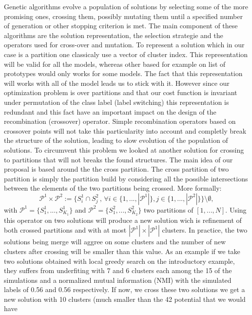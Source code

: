 \documentclass[]{article}
\begin{document}
Genetic algorithms evolve a population of solutions by selecting some of
the more promising ones, crossing them, possibly mutating them until a
specified number of generation or other stopping criterion is met. The
main component of these algorithms are the solution representation, the
selection strategie and the operators used for cross-over and mutation.
To represent a solution which in our case is a partition one classicaly
use a vector of cluster index. This representation will be valid for all
the models, whereas other based for example on list of prototypes would
only works for some models. The fact that this representation will works
with all of the model leads us to stick with it. However since our
optimization problem is over partitions and that our cost function is
invariant under permutation of the class label (label switching) this
representation is redundant and this fact have an important impact on
the design of the recombination (crossover) operator. Simple
recombination operators based on crossover points will not take this
particularity into account and completly break the structure of the
solution, leading to slow evolution of the population of solutions. To
circumvent this problem we looked at another solution for crossing to
partitions that will not breaks the found structures. The main idea of
our proposal is based around the the cross partition. The cross
partition of two partition is simply the partition build by considering
all the possible intersections between the elements of the two
partitions being crossed. More formally: \[
\mathcal{P}^1\times\mathcal{P}^2 := \{S^1_i \cap S^2_j \,,\, \forall i\in \{1,...,|\mathcal{P}^1|\}, j\in \{1,...,|\mathcal{P}^2|\}\}\setminus \emptyset,
\] with \(\mathcal{P}^1=\{S_1^1,...,S^1_{K_1}\}\) and
\(\mathcal{P}^2=\{S_1^2,...,S^2_{K_2}\}\) two partitions of
\([1,...,N]\). Using this operator on two solutions will produce a new
solution wich is refinement of both crossed partitions and with at most
\(|\mathcal{P}^1|\times|\mathcal{P}^1|\) clusters. In practice, the two
solutions being merge will aggree on some clusters and the number of new
clusters after crossing will be smaller than this value. As an example
if we take two solutions obtained with local greedy search on the
introductory example, they suffers from underfiting with 7 and 6
clusters each among the 15 of the simulations and a normalized mutual
information (NMI) with the simulated labels of 0.56 and 0.56
respectively. If now, we cross these two solutions we get a new solution
with 10 clusters (much smaller than the 42 potential that we would have
\end{document}
